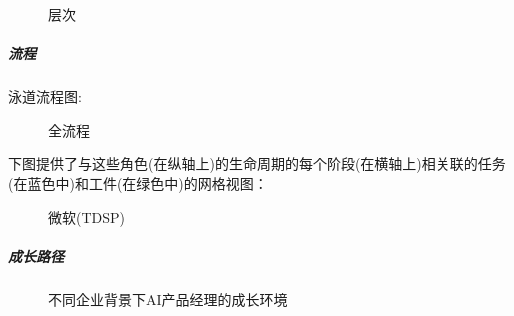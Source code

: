 \documentclass[letterpaper,10pt,english]{sphinxmanual}
\begin{document}
\begin{figure}[H]
\centering
\capstart

\noindent{}
\caption{层次 \sphinxfootnotemark[294]}\label{\detokenize{chapter_introduction/AI_PM:id61}}\end{figure}
%
\begin{footnotetext}[294]\sphinxAtStartFootnote
{}
%
\end{footnotetext}\ignorespaces 

\subparagraph{流程}
\label{\detokenize{chapter_introduction/AI_PM:id24}}
泳道流程图:

\begin{figure}[H]
\centering
\capstart

\noindent{}
\caption{全流程}\label{\detokenize{chapter_introduction/AI_PM:id62}}\end{figure}

下图提供了与这些角色(在纵轴上)的生命周期的每个阶段(在横轴上)相关联的任务(在蓝色中)和工件(在绿色中)的网格视图：

\begin{figure}[H]
\centering
\capstart

\noindent{}
\caption{微软(TDSP)}\label{\detokenize{chapter_introduction/AI_PM:id63}}\end{figure}


\subparagraph{成长路径}
\label{\detokenize{chapter_introduction/AI_PM:id25}}
\begin{figure}[H]
\centering
\capstart

\noindent{}
\caption{不同企业背景下AI产品经理的成长环境\sphinxfootnotemark[295]}\label{\detokenize{chapter_introduction/AI_PM:id64}}\end{figure}
%
\begin{footnotetext}[295]\sphinxAtStartFootnote
{}
%
\end{footnotetext}\ignorespaces 
\end{document}
